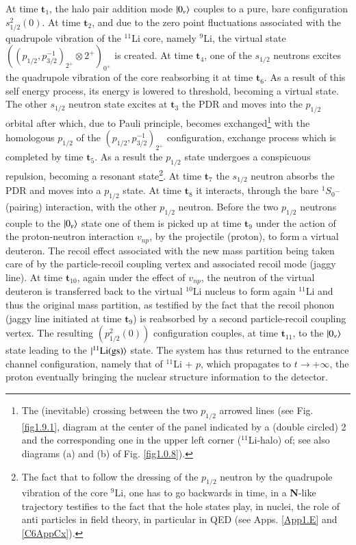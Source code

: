  At time $\mathbf{t}_1$, the halo pair addition mode $|{0_\nu} \rangle$ couples to a pure, bare configuration $s_{1/2}^2(0)$. At time $\mathbf{t}_2$, and due to the zero point fluctuations associated with the quadrupole vibration of the $^{11}$Li core, namely $^9$Li, the virtual state $((p_{1/2},p_{3/2}^{-1})_{2^+}\otimes 2^+)_{0^+}$ is created. At time $\mathbf{t}_4$, one of the  $s_{1/2}$ neutrons excites the quadrupole vibration of the core reabsorbing it at time $\mathbf{t}_6$. As a result of this self energy process, its energy is lowered to threshold, becoming a virtual state. The other $s_{1/2}$  neutron state excites at $\mathbf{t}_3$ the PDR and moves into the $p_{1/2}$ orbital after which,  due to Pauli principle, becomes exchanged\footnote{The (inevitable) crossing between the two $p_{1/2}$ arrowed lines (see Fig. \ref{fig1.9.1},  diagram at the center of the panel indicated by a (double circled) 2 and the corresponding one in the upper left corner ($^{11}$Li-halo) of; see also diagrams (a) and (b) of Fig. \ref{fig1.0.8}).} with the homologous $p_{1/2}$ of the $(p_{1/2},p_{3/2}^{-1})_{2^+}$
configuration, exchange process which is completed by time $\mathbf{t}_5$. As a result the $p_{1/2}$ state undergoes a conspicuous repulsion, becoming a resonant state\footnote{The fact that to follow the dressing of the $p_{1/2}$ neutron by the quadrupole vibration of the core $^9$Li, one has to go backwards in time, in a \textbf{N}-like trajectory testifies to the fact that the hole states play, in nuclei, the role of anti particles in field theory, in particular in QED (see Apps. \ref{App1.E} and \ref{C6AppCx}). }. At time $\mathbf{t}_7$ the $s_{1/2}$ neutron absorbs the PDR and moves into a $p_{1/2}$ state. At time $\mathbf{t}_8$ it interacts, through the bare $^1S_0$--(pairing) interaction, with the other $p_{1/2}$ neutron. Before the two $p_{1/2}$ neutrons couple to the $|{0_\nu} \rangle$ state one of them is picked up at time $\mathbf{t}_9$ under the action of the proton-neutron interaction $v_{np}$, by the projectile (proton), to form a virtual deuteron. The recoil effect associated with the new mass partition being taken care of by the particle-recoil coupling vertex and associated recoil mode (jaggy line). At time $\mathbf{t}_{10}$, again under the effect of $v_{np}$, the neutron of the virtual deuteron is transferred back to the virtual $^{10}$Li nucleus to form again $^{11}$Li and thus the original mass partition, as testified by the fact that the recoil phonon (jaggy line initiated at time $\mathbf{t}_9$) is reabsorbed by a second particle-recoil coupling vertex. The resulting $(p^2_{1/2}(0))$ configuration couples, at time $\mathbf{t}_{11}$, to the $|{0_\nu} \rangle$ state leading to the $|{^{11}\text{Li(gs)}} \rangle$ state. The system has thus returned to the entrance channel configuration, namely that of $^{11}$Li + $p$, which propagates to $t\to+\infty$, the proton eventually bringing the nuclear structure information to the detector.


